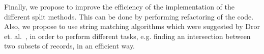 \documentclass[a4paper,12pt]{article}
\begin{document}
\begin{spacing}{1.5}
Finally, we propose to improve the efficiency of the implementation of the different split methods. This can be done by performing refactoring of the code. Also, we propose to use string matching algorithms which were suggested by Dror et. al.~\cite{dror2014occt}, in order to perform different tasks, e.g. finding an intersection between two subsets of records, in an efficient way.



\restoregeometry
\end{spacing}
\end{document}
